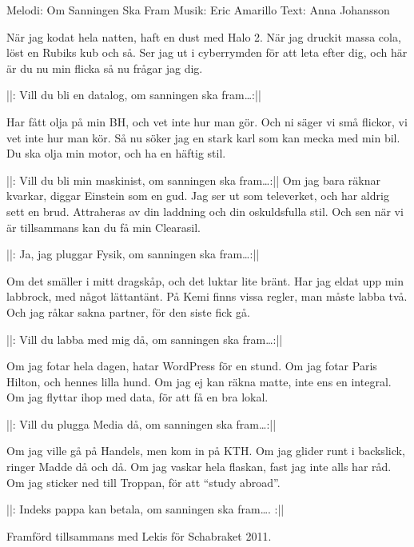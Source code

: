 \begin{song}

\begin{songmeta}
Melodi: Om Sanningen Ska Fram
Musik: Eric Amarillo
Text: Anna Johansson
\end{songmeta}

\begin{songtext}
När jag kodat hela natten,
haft en dust med Halo 2.
När jag druckit massa cola,
löst en Rubiks kub och så.
Ser jag ut i cyberrymden
för att leta efter dig,
och här är du nu min flicka
så nu frågar jag dig.

||: Vill du bli en datalog,
om sanningen ska fram\ldots :||

Har fått olja på min BH,
och vet inte hur man gör.
Och ni säger vi små flickor,
vi vet inte hur man kör.
Så nu söker jag en stark karl
som kan mecka med min bil.
Du ska olja min motor,
och ha en häftig stil.

||: Vill du bli min maskinist,
om sanningen ska fram\ldots :||
\newpage
Om jag bara räknar kvarkar,
diggar Einstein som en gud.
Jag ser ut som televerket,
och har aldrig sett en brud.
Attraheras av din laddning
och din oskuldsfulla stil.
Och sen när vi är tillsammans
kan du få min Clearasil.

||: Ja, jag pluggar Fysik,
om sanningen ska fram\ldots :||

Om det smäller i mitt dragskåp,
och det luktar lite bränt.
Har jag eldat upp min labbrock,
med något lättantänt.
På Kemi finns vissa regler,
man måste labba två.
Och jag råkar sakna partner,
för den siste fick gå.

||: Vill du labba med mig då,
om sanningen ska fram\ldots :||

\newpage
Om jag fotar hela dagen,
hatar WordPress för en stund.
Om jag fotar Paris Hilton,
och hennes lilla hund.
Om jag ej kan räkna matte,
inte ens en integral.
Om jag flyttar ihop med data,
för att få en bra lokal.

||: Vill du plugga Media då,
om sanningen ska fram\ldots :||

Om jag ville gå på Handels,
men kom in på KTH.
Om jag glider runt i backslick,
ringer Madde då och då.
Om jag vaskar hela flaskan,
fast jag inte alls har råd.
Om jag sticker ned till Troppan,
för att \textquotedblleft{}study abroad\textquotedblright{}.

||: Indeks pappa kan betala,
om sanningen ska fram\ldots. :||

\end{songtext}

\begin{songnotes}
Framförd tillsammans med Lekis för Schabraket 2011.
\end{songnotes}
\end{song}
